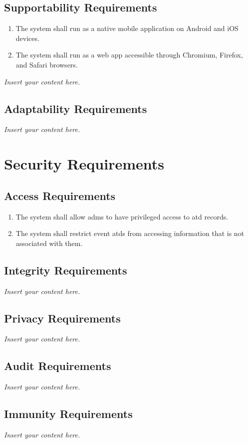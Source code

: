 \documentclass[12pt]{article}
\newcommand{\lips}{\textit{Insert your content here.}}
\begin{document}
\subsection{Supportability Requirements}
\begin{enumerate}[align=left,
  leftmargin=*,
  labelsep=1em,
  itemindent=0em,
  label=\bfseries SU-\arabic*:]
  \item The system shall run as a native mobile application on Android and iOS devices.
  \item The system shall run as a web app accessible through Chromium, Firefox, and
    Safari browsers.
\end{enumerate}
\lips
\subsection{Adaptability Requirements}
\lips

\section{Security Requirements}
\subsection{Access Requirements}
\begin{enumerate}[align=left,
  leftmargin=*,
  labelsep=1em,
  itemindent=0em,
  label=\bfseries AC-\arabic*:]
  \item The system shall allow \glspl{adm} to have privileged access to \gls{atd} records.
  \item The system shall restrict event \glspl{atd} from accessing information that is not associated with them.
\end{enumerate}
\subsection{Integrity Requirements}
\lips
\subsection{Privacy Requirements}
\lips
\subsection{Audit Requirements}
\lips
\subsection{Immunity Requirements}
\lips
\end{document}
